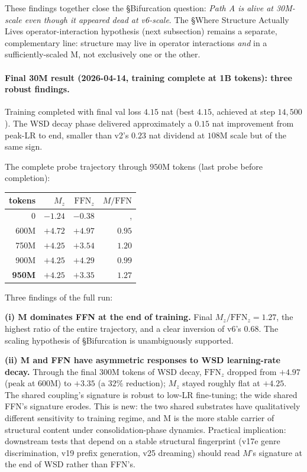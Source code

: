 \documentclass[11pt, a4paper]{article}
\theoremstyle{plain}
\theoremstyle{definition}
\theoremstyle{remark}
\begin{document}
These findings together close the §Bifurcation question: \emph{Path A is alive at 30M-scale even though it appeared dead at v6-scale}.
The §Where Structure Actually Lives operator-interaction hypothesis (next subsection) remains a separate, complementary line: structure may live in operator interactions \emph{and} in a sufficiently-scaled M, not exclusively one or the other.

\paragraph{Final 30M result (2026-04-14, training complete at 1B tokens): three robust findings.}
Training completed with final val loss $4.15$ nat (best $4.15$, achieved at step $14{,}500$). The WSD decay phase delivered approximately a $0.15$ nat improvement from peak-LR to end, smaller than v2's $0.23$ nat dividend at $108$M scale but of the same sign.

The complete probe trajectory through $950$M tokens (last probe before completion):
\begin{center}
\small
\begin{tabular}{rrrr}
\toprule
tokens & $M_z$ & $\mathrm{FFN}_z$ & $M/\mathrm{FFN}$ \\
\midrule
0 & $-1.24$ & $-0.38$ & ,  \\
600M & $+4.72$ & $+4.97$ & $0.95$ \\
750M & $+4.25$ & $+3.54$ & $1.20$ \\
900M & $+4.25$ & $+4.29$ & $0.99$ \\
\textbf{950M} & $\mathbf{+4.25}$ & $\mathbf{+3.35}$ & $\mathbf{1.27}$ \\
\bottomrule
\end{tabular}
\end{center}

Three findings of the full run:

\textbf{(i) M dominates FFN at the end of training.}
Final $M_z / \mathrm{FFN}_z = 1.27$, the highest ratio of the entire trajectory, and a clear inversion of v6's $0.68$. The scaling hypothesis of §Bifurcation is unambiguously supported.

\textbf{(ii) M and FFN have asymmetric responses to WSD learning-rate decay.}
Through the final $300$M tokens of WSD decay, $\mathrm{FFN}_z$ dropped from $+4.97$ (peak at $600$M) to $+3.35$ (a $32\%$ reduction); $M_z$ stayed roughly flat at $+4.25$. The shared coupling's signature is robust to low-LR fine-tuning; the wide shared FFN's signature erodes. This is new: the two shared substrates have qualitatively different sensitivity to training regime, and M is the more stable carrier of structural content under consolidation-phase dynamics. Practical implication: downstream tests that depend on a stable structural fingerprint (v17e genre discrimination, v19 prefix generation, v25 dreaming) should read $M$'s signature at the end of WSD rather than FFN's.
\end{document}
